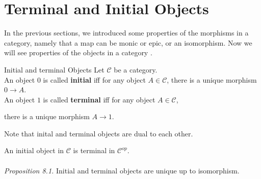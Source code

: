 \section {Terminal and Initial Objects}
In the previous sections, we introduced some properties of the morphisms in a category, namely that a map can be monic or epic, or an isomorphism. Now we will see properties of the objects in a category .
\begin {definition}{Initial and terminal Objects}
  Let $\mathscr{C}$ be a category.\\

  An object $0$ is called \textbf{initial}  iff for any object $A \in \mathscr{C}$,
  there is a unique morphism $0 \to A$.\\
  An object $1$ is called \textbf{terminal} iff for any object $A \in \mathscr{C}$,

  there is a unique morphism $A \to 1$.
\end {definition}

Note that inital and terminal objects are dual to each other.


An initial object in $\mathscr{C}$ is terminal in $\mathscr{C}^{op}$.\\
\\\textit{Proposition 8.1.}
Initial and terminal objects are unique up to isomorphism.

